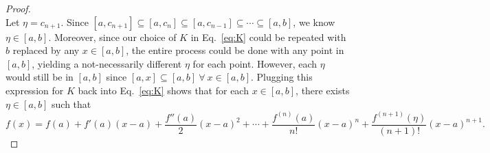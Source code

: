 \documentclass[12pt,twocolumn]{article}
\begin{document}
\begin{proof}
\begin{equation}
\end{equation}
Let $\eta=c_{n+1}$. Since $[a,c_{n+1}]\subseteq[a,c_n]\subseteq[a,c_{n-1}]\subseteq\cdots\subseteq[a,b]$, we know $\eta\in[a,b]$. Moreover, since our choice of $K$ in Eq.~\ref{eq:K} could be repeated with $b$ replaced by any $x\in[a,b]$, the entire process could be done with any point in $[a,b]$, yielding a not-necessarily different $\eta$ for each point. However, each $\eta$ would still be in $[a,b]$ since $[a,x]\subseteq[a,b]~\forall~x\in[a,b]$. Plugging this expression for $K$ back into Eq.~\ref{eq:K} shows that for each $x\in[a,b]$, there exists $\eta\in[a,b]$ such that
\begin{equation}
f(x) = f(a) + f'(a)(x-a) + \frac{f''(a)}{2}(x-a)^2 + \cdots + \frac{f^{(n)}(a)}{n!}(x-a)^n + \frac{f^{(n+1)}(\eta)}{(n+1)!}(x-a)^{n+1}.
\end{equation}
\end{proof}
\end{document}
